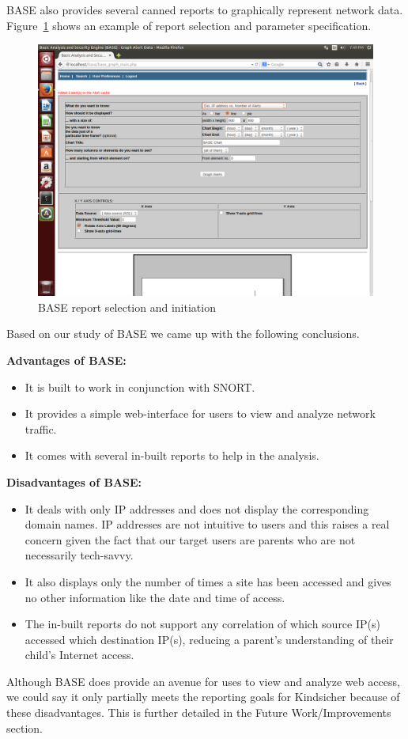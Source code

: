 BASE also provides several canned reports to graphically represent
network data. Figure~\ref{fig:r4} shows an example of report selection and
parameter specification.

\begin{figure}[!t]
    \centering
    \includegraphics[width=\columnwidth]{figures/R4_BASE_Report}
    \caption{BASE report selection and initiation}
    \label{fig:r4}
\end{figure}

Based on our study of BASE we came up with the following conclusions.

\textbf{Advantages of BASE:}
\begin{itemize}

\item It is built to work in conjunction with SNORT.

\item It provides a simple web-interface for users to view and
  analyze network traffic.

\item It comes with several in-built reports to help in the analysis.

\end{itemize}

\textbf{Disadvantages of BASE:}
\begin{itemize}

\item It deals with only IP addresses and does not display the
  corresponding domain names.
  IP addresses are not intuitive to users and this raises a real
  concern given the fact that our target users are parents who are not
  necessarily tech-savvy.

\item It also displays only the number of times a site has been
  accessed and gives no other information like the date and time of
  access.

\item The in-built reports do not support any correlation of which
  source IP(s) accessed which destination IP(s), reducing a parent's
  understanding of their child's Internet access.

\end{itemize}

Although BASE does provide an avenue for uses to view and analyze web
access, we could say it only partially meets the reporting goals for
Kindsicher because of these disadvantages.
%
This is further detailed in the Future Work/Improvements section.
%



